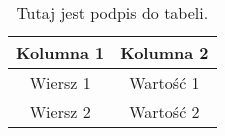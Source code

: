 \begin{table}[h]
    \centering
    \begin{tabular}{|c|c|}
        \hline
        Kolumna 1 & Kolumna 2 \\
        \hline
        Wiersz 1 & Wartość 1 \\
        Wiersz 2 & Wartość 2 \\
        \hline
    \end{tabular}
    \label{tab:pawel_rycerz}
    \caption{Tutaj jest podpis do tabeli.}
\end{table}